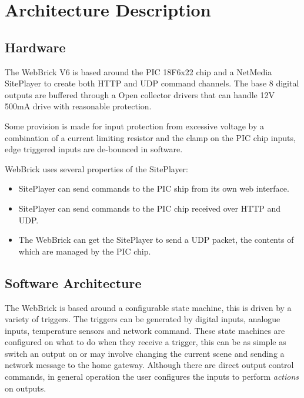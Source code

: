 \section{Architecture Description}

\subsection{Hardware}

The WebBrick V6 is based around the PIC 18F6x22 chip and a NetMedia SitePlayer  to create 
both HTTP and UDP command channels. The base 8 digital outputs are buffered through a Open collector 
drivers that can handle 12V 500mA drive with reasonable protection.

Some provision is made for input protection from excessive voltage by a combination of a current limiting
resistor and the clamp on the PIC chip inputs, edge triggered inputs are de-bounced in software.

WebBrick uses several properties of the SitePlayer:

\begin{itemize}

\item

SitePlayer can send commands to the PIC ship from its own web interface.

\item

SitePlayer can send commands to the PIC chip received over HTTP and UDP.

\item

The WebBrick can get the SitePlayer to send a UDP packet, the contents of which are 
managed by the PIC chip.

\end{itemize}

\subsection{Software Architecture}

The WebBrick is based around a configurable state machine, this is driven by a variety
of triggers. The triggers can be generated by digital inputs, analogue inputs, temperature sensors
and network command. These state machines are configured on what to do when they receive a trigger, this
can be as simple as switch an output on or may involve changing the current scene and sending a network
message to the home gateway.
Although there 
are direct output control commands, in general operation the user configures the inputs to perform 
{\em actions} on outputs.

